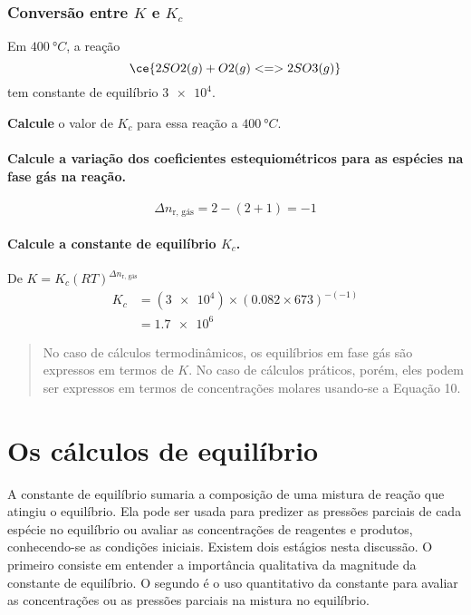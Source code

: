 \begin{example}

\subsubsection{\texorpdfstring{Conversão entre \(K\) e \(K_c\)}{Conversão entre K e K\_c}}

Em \(\qty{400}{\unit{\degree C}}\), a reação \[
    \ce{ 2 SO2(g) + O2(g) <=> 2 SO3(g) }
\] tem constante de equilíbrio \(\num{3e4}\).

\textbf{Calcule} o valor de \(K_c\) para essa reação a \(\qty{400}{\unit{\degree C}}\).

\paragraph{Calcule a variação dos coeficientes estequiométricos para as espécies na fase gás na reação.}

\[
    \Delta n_\text{r, gás} = 2 - (2 + 1) = -1
\]

\paragraph{\texorpdfstring{Calcule a constante de equilíbrio \(K_c\).}{Calcule a constante de equilíbrio K\_c.}}

De \(K = K_c \left( RT \right)^{\Delta n_\text{r, gás}}\) \[
\begin{aligned}
    K_c &= (\num{3e4}) 
            \times \left( \num{0,082} \times \num{673} \right)^{-(-1)} \\
        &= \boxed{ \num{1,7e6} }
\end{aligned}
\]

\end{example}

\begin{quote}
No caso de cálculos termodinâmicos, os equilíbrios em fase gás são expressos em termos de \(K\). No caso de cálculos práticos, porém, eles podem ser
expressos em termos de concentrações molares usando‑se a Equação 10.
\end{quote}

\section{Os cálculos de equilíbrio}

A constante de equilíbrio sumaria a composição de uma mistura de reação que atingiu o equilíbrio. Ela pode ser usada para predizer as pressões
parciais de cada espécie no equilíbrio ou avaliar as concentrações de reagentes e produtos, conhecendo-se as condições iniciais. Existem dois estágios
nesta discussão. O primeiro consiste em entender a importância qualitativa da magnitude da constante de equilíbrio. O segundo é o uso quantitativo da
constante para avaliar as concentrações ou as pressões parciais na mistura no equilíbrio.

